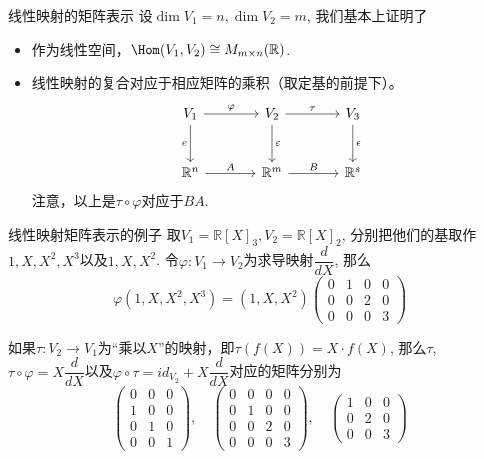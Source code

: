
\begin{frame}[fragile]

\begin{block}{线性映射的矩阵表示}
设$\dim V_1 = n, \dim V_2 = m$, 我们基本上证明了
\begin{itemize}
\item 作为线性空间，$\Hom(V_1, V_2) \cong M_{m\times n}(\mathbb{R})$.
\item 线性映射的复合对应于相应矩阵的乘积（取定基的前提下）。
\[
\begin{tikzcd}[column sep = large, row sep = large]
V_1 \ar[r, "\varphi"] \ar[d, "e"'] & V_2 \ar[r, "\tau"] \ar[d, "\varepsilon"] & V_3 \ar[d, "\epsilon"] \\
\mathbb{R}^n \ar[r, "A"] & \mathbb{R}^m \ar[r, "B"] & \mathbb{R}^s
\end{tikzcd}
\]
注意，以上是$\tau\circ\varphi$对应于$BA$.
\end{itemize}
\end{block}

\end{frame}


\begin{frame}

\begin{block}{线性映射矩阵表示的例子}
取$V_1 = \mathbb{R}[X]_3, V_2 = \mathbb{R}[X]_2$, 分别把他们的基取作$1,X,X^2,X^3$以及$1,X,X^2$. 令$\varphi: V_1 \to V_2$为求导映射$\dfrac{d}{dX}$, 那么
$$\varphi(1,X,X^2,X^3) = (1,X,X^2) \begin{pmatrix}
0 & 1 & 0 & 0 \\ 0 & 0 & 2 & 0 \\ 0 & 0 & 0 & 3
\end{pmatrix}$$

\pause

如果$\tau: V_2 \to V_1$为``乘以$X$''的映射，即$\tau(f(X)) = X\cdot f(X)$, 那么$\tau$, $\tau\circ\varphi = X\dfrac{d}{dX}$以及$\varphi\circ\tau = id_{V_2} + X\dfrac{d}{dX}$对应的矩阵分别为
$$\begin{pmatrix} 0 & 0 & 0 \\ 1 & 0 & 0 \\ 0 & 1 & 0 \\ 0 & 0 & 1 \end{pmatrix}, \quad \begin{pmatrix}
0 & 0 & 0 & 0 \\ 0 & 1 & 0 & 0 \\ 0 & 0 & 2 & 0 \\ 0 & 0 & 0 & 3 \end{pmatrix}, \quad \begin{pmatrix} 1 & 0 & 0 \\ 0 & 2 & 0 \\ 0 & 0 & 3 \end{pmatrix}$$
\end{block}

\end{frame}

